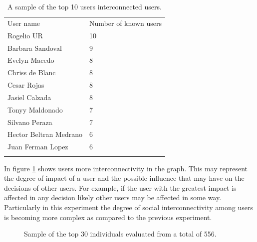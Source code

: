 \begin{table}
\small
\caption{A sample of the top 10 users interconnected users.}
\label{tab:knownUsers_2}
\centering
\small
\begin{tabular}{p{3cm} p{3cm}  }
\hline\noalign{\smallskip}
 User name & Number of known users \\
\noalign{\smallskip}\hline\noalign{\smallskip}
\small{Rogelio UR} & \small{10}  \\ \hline
\small{Barbara Sandoval} & \small{9}  \\ \hline
\small{Evelyn Macedo} & \small{8}  \\ \hline
\small{Chriss de Blanc} & \small{8}  \\ \hline
\small{Cesar Rojas} & \small{8}  \\ \hline
\small{Jasiel Calzada} & \small{8}  \\ \hline
\small{Tonyy Maldonado} & \small{7}  \\ \hline
\small{Silvano Peraza} & \small{7}  \\ \hline
\small{Hector Beltran Medrano} & \small{6}  \\ \hline
\small{Juan Ferman Lopez} & \small{6}  \\ \hline
\noalign{\smallskip}\hline
\end{tabular}
\end{table}

In figure \ref{fig:bestIndividuals_2} shows users more interconnectivity in the
graph. This may represent the degree of impact of a user and the possible
influence that may have on the decisions of other users.  For example, if the
user with the greatest impact is affected in any decision likely other users may
be affected in some way. Particularly in this experiment the degree of social
interconnectivity among users is becoming more complex as compared to the
previous experiment.

\begin{figure}
\centering
{} %
\caption{Sample of the top 30 individuals evaluated from a total of 556.}
\label{fig:bestIndividuals_2}
\end{figure}

